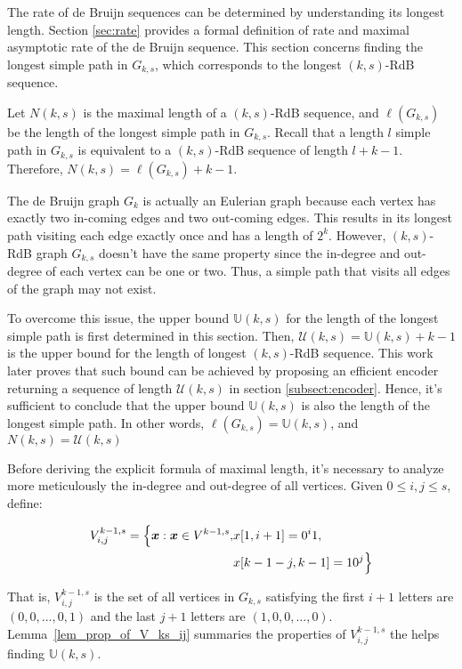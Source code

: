 The rate of de Bruijn sequences can be determined by understanding its longest length. Section \ref{sec:rate} provides a formal definition of rate and maximal asymptotic rate of the de Bruijn sequence. This section concerns finding the longest simple path in $G_{k,s}$, which corresponds to the longest $(k,s)$-RdB sequence.

Let $N(k,s)$ is the maximal length of a $(k,s)$-RdB sequence, and $\ell(G_{k,s})$ be the length of the longest simple path in $G_{k,s}$. Recall that a length $l$ simple path in $G_{k,s}$ is equivalent to a $(k,s)$-RdB sequence of length $l+k-1$. Therefore, $N(k,s) = \ell(G_{k,s})+k-1$. 

The de Bruijn graph $G_{k}$ is actually an Eulerian graph because each vertex has exactly two in-coming edges and two out-coming edges. This results in its longest path visiting each edge exactly once and has a length of $2^{k}$. However, $(k,s)$-RdB graph $G_{k,s}$ doesn't have the same property since the in-degree and out-degree of each vertex can be one or two. Thus, a simple path that visits all edges of the graph may not exist. 

To overcome this issue, the upper bound $\mathbb{U}(k,s)$ for the length of the longest simple path is first determined in this section. Then, $\mathcal{U}(k,s)=\mathbb{U}(k,s)+k-1$ is the upper bound for the length of longest $(k,s)$-RdB sequence. This work later proves that such bound can be achieved by proposing an efficient encoder returning a sequence of length $\mathcal{U}(k,s)$ in section \ref{subsect:encoder}. Hence, it's sufficient to conclude that the upper bound $\mathbb{U}(k,s)$ is also the length of the longest simple path. In other words, $\ell(G_{k,s})=\mathbb{U}(k,s)$, and $N(k,s)=\mathcal{U}(k,s)$

Before deriving the explicit formula of maximal length, it's necessary to analyze more meticulously the in-degree and out-degree of all vertices. Given $0\leq i,j\leq s$, define:

\begin{align*}
    V^{k-1,s}_{i,j} = \Bigl\{ {\boldsymbol x}: {\boldsymbol x}\in V^{k-1,s}, &x[1,i+1]=0^{i}1,  \\
    &x[k-1-j,k-1]=10^{j} \Bigl\}
\end{align*}

That is, $V^{k-1,s}_{i,j}$ is the set of all vertices in $G_{k,s}$ satisfying the first $i+1$ letters are $(0,0,\ldots,0,1)$ and the last $j+1$ letters are $(1,0,0,\ldots,0)$. Lemma~\ref{lem_prop_of_V_ks_ij} summaries the properties of $V^{k-1,s}_{i,j}$ the helps finding $\mathbb{U}(k,s)$.


